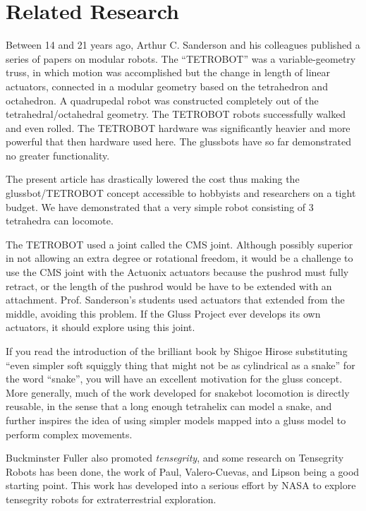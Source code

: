 \documentclass[11pt]{article}
\begin{document}
\section{Related Research}

Between 14 and 21 years ago, Arthur C. Sanderson and his colleagues published a series of
papers\cite{sanderson1996modular,lee2002dynamic,lee1999dynamics} on modular robots.
The ``TETROBOT'' was a variable-geometry truss, in which motion was accomplished but the change
in length of linear actuators, connected in a modular geometry based on the tetrahedron and octahedron.
A quadrupedal robot was constructed completely out of the tetrahedral/octahedral geometry.
The TETROBOT robots successfully walked and even rolled. The TETROBOT hardware was significantly
heavier and more powerful that then hardware used here. The glussbots have so far demonstrated no greater functionality.

The present article has drastically lowered the cost thus making the glussbot/TETROBOT concept
accessible to hobbyists and researchers on a tight budget. We have demonstrated that a very
simple robot consisting of 3 tetrahedra can locomote.

The TETROBOT used a joint called the CMS joint. Although
possibly superior in not allowing an extra degree or rotational freedom, it would be a challenge to use the CMS
joint with the Actuonix actuators because the pushrod must fully retract, or the length of the pushrod would be
have to be extended with an attachment. Prof. Sanderson's students used actuators that
extended from the middle, avoiding this problem. If the Gluss Project ever develops its own actuators, it should
explore using this joint.

If you read the introduction of the brilliant book by Shigoe Hirose\cite{hirose1993biologically} substituting
``even simpler soft squiggly thing that might not be as cylindrical as a snake'' for the word ``snake'', you will have
an excellent motivation for the gluss concept.  More generally, much of the work developed for snakebot
locomotion\cite{liljebäck2012snake} is directly reusable, in the sense that a long enough tetrahelix can
model a snake, and further inspires the idea of using simpler models mapped into a gluss model to perform
complex movements.

Buckminster Fuller also promoted \emph{tensegrity}, and some research on Tensegrity Robots has been done, the
work of Paul, Valero-Cuevas, and Lipson\cite{paul2006} being a good starting point.
This work has developed into a serious effort by NASA to explore tensegrity robots for extraterrestrial
exploration.
\end{document}
